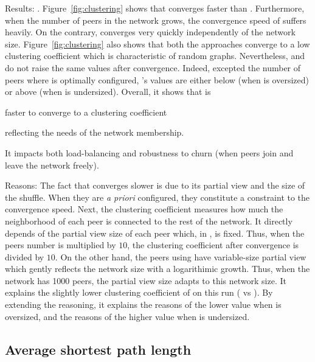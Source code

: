 \begin{asparadesc}
\item[Results:] . Figure~\ref{fig:clustering}
  shows that \SPRAY converges faster than \CYCLON. Furthermore, when the
  number of peers in the network grows, the convergence speed of \CYCLON
  suffers heavily. On the contrary, \SPRAY converges very quickly
  independently of the network size. Figure~\ref{fig:clustering} also shows
  that both the approaches converge to a low clustering coefficient which is
  characteristic of random graphs. Nevertheless, \CYCLON and \SPRAY do not
  raise the same values after convergence. Indeed, excepted the number of peers
  where \CYCLON is optimally configured, \SPRAY's values are either below
  (when \CYCLON is oversized) or above (when \CYCLON is undersized).
  Overall, it shows that \SPRAY is
  \begin{inparaenum}
  \item faster to converge to a clustering coefficient
  \item reflecting the needs of the network membership.
  \end{inparaenum}
  It impacts both load-balancing and robustness to churn (when peers join and
  leave the network freely).
\item[Reasons:] The fact that \CYCLON converges slower is due to its partial
  view and the size of the shuffle. When they are \emph{a priori} configured,
  they constitute a constraint to the convergence speed.  Next, the clustering
  coefficient measures how much the neighborhood of each peer is connected to
  the rest of the network. It directly depends of the partial view size of each
  peer which, in \CYCLON, is fixed. Thus, when the peers number is multiplied
  by $10$, the clustering coefficient after convergence is divided by $10$. On
  the other hand, the peers using \SPRAY have variable-size partial view which
  gently reflects the network size with a logarithimic growth. Thus, when the
  network has 1000 peers, the partial view size adapts to this network size. It
  explains the slightly lower clustering coefficient of \SPRAY on this run
  ( vs ). By extending the reasoning, it explains the
  reasons of the \SPRAY lower value when \CYCLON is oversized, and the reasons
  of the \SPRAY higher value when \CYCLON is undersized.
\end{asparadesc}

\subsection{Average shortest path length}
\label{subsec:avg}

